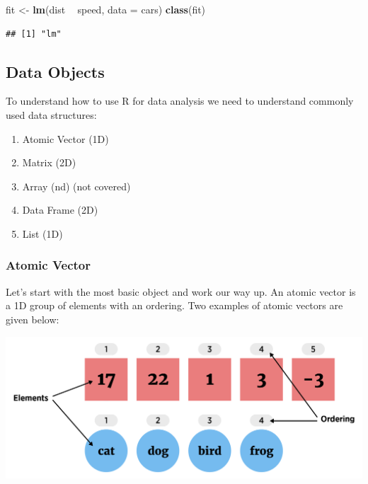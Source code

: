 \documentclass[
]{book}
\newenvironment{Shaded}{\begin{snugshade}}{\end{snugshade}}
\newcommand{\DataTypeTok}[1]{\textcolor[rgb]{0.13,0.29,0.53}{#1}}
\newcommand{\KeywordTok}[1]{\textcolor[rgb]{0.13,0.29,0.53}{\textbf{#1}}}
\newcommand{\NormalTok}[1]{#1}
\newcommand{\OperatorTok}[1]{\textcolor[rgb]{0.81,0.36,0.00}{\textbf{#1}}}
\newcommand{\StringTok}[1]{\textcolor[rgb]{0.31,0.60,0.02}{#1}}
\providecommand{\tightlist}{%
  \setlength{\itemsep}{0pt}\setlength{\parskip}{0pt}}
\theoremstyle{definition}
\theoremstyle{definition}
\theoremstyle{definition}
\theoremstyle{remark}
\begin{document}
\begin{Shaded}
\begin{Highlighting}[]
\NormalTok{fit <-}\StringTok{ }\KeywordTok{lm}\NormalTok{(dist }\OperatorTok{~}\StringTok{ }\NormalTok{speed, }\DataTypeTok{data =}\NormalTok{ cars)}
\KeywordTok{class}\NormalTok{(fit)}
\end{Highlighting}
\end{Shaded}

\begin{verbatim}
## [1] "lm"
\end{verbatim}

\hypertarget{data-objects}{%
\subsection{Data Objects}\label{data-objects}}

To understand how to use R for data analysis we need to understand commonly used data structures:

\begin{enumerate}
\def\labelenumi{\arabic{enumi}.}
\tightlist
\item
  Atomic Vector (1D)\\
\item
  Matrix (2D)\\
\item
  Array (nd) (not covered)\\
\item
  Data Frame (2D)\\
\item
  List (1D)
\end{enumerate}

\hypertarget{atomic-vector}{%
\subsubsection{Atomic Vector}\label{atomic-vector}}

Let's start with the most basic object and work our way up. An atomic vector is a 1D group of elements with an ordering. Two examples of atomic vectors are given below:

\begin{center}\includegraphics[width=0.8\linewidth]{img/vectorVisualF} \end{center}
\end{document}
